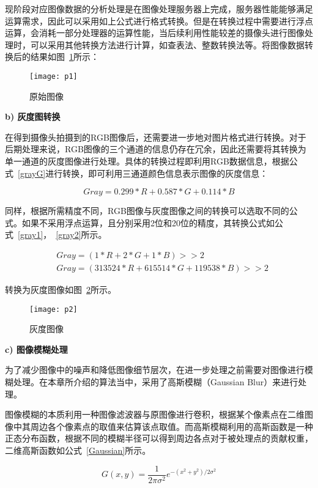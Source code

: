 现阶段对应图像数据的分析处理是在图像处理服务器上完成，服务器性能能够满足运算需求，因此可以采用如上公式进行格式转换。但是在转换过程中需要进行浮点运算，会消耗一部分处理器的运算性能，当后续利用性能较差的摄像头进行图像处理时，可以采用其他转换方法进行计算，如查表法、整数转换法等。将图像数据转换后的结果如图~\ref{p1}所示：

\begin{figure}[H] 
  \centering
  \texttt{[image: p1]}
  \caption{原始图像}
  \label{p1}
\end{figure}

\textbf{b) 灰度图转换}

在得到摄像头拍摄到的RGB图像后，还需要进一步地对图片格式进行转换。对于后期处理来说，RGB图像的三个通道的信息仍存在冗余，因此还需要将其转换为单一通道的灰度图像进行处理。具体的转换过程即利用RGB数据信息，根据公式~\ref{grayG}进行转换，即可利用三通道颜色信息表示图像的灰度信息：

\begin{equation}
Gray = 0.299 * R + 0.587 * G + 0.114 * B
  \label{grayG}
\end{equation}

同样，根据所需精度不同，RGB图像与灰度图像之间的转换可以选取不同的公式。如果不采用浮点运算，且分别采用2位和20位的精度，其转换公式如公式~\ref{gray1}，~\ref{gray2}所示。

\begin{align}
& Gray = (1 * R + 2 * G + 1 * B) >> 2
  \label{gray1} \\
& Gray = (313524 * R + 615514 * G + 119538 * B) >> 2
  \label{gray2}
\end{align}

转换为灰度图像如图~\ref{p2}所示。

\begin{figure}[h] 
  \centering
  \texttt{[image: p2]}
  \caption{灰度图像}
  \label{p2}
\end{figure}

\textbf{c) 图像模糊处理}

为了减少图像中的噪声和降低图像细节层次，在进一步处理之前需要对图像进行模糊处理。在本章所介绍的算法当中，采用了高斯模糊（Gaussian Blur）来进行处理。

图像模糊的本质利用一种图像滤波器与原图像进行卷积，根据某个像素点在二维图像中其周边各个像素点的取值来估算该点取值。而高斯模糊利用的高斯函数是一种正态分布函数，根据不同的模糊半径可以得到周边各点对于被处理点的贡献权重，二维高斯函数如公式~\ref{Gaussian}所示。

\begin{equation}
G(x,y) = \frac{1}{2 \pi \sigma^2}e^{-(x^2+y^2)/2\sigma ^2}
  \label{Gaussian}
\end{equation}

